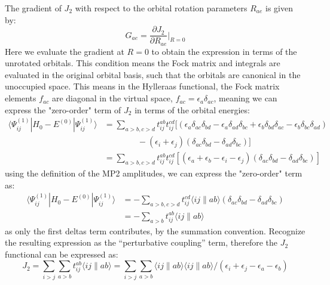 The gradient of $J_2$ with respect to the orbital rotation parameters $R_{ae}$ is given by:
\begin{equation}
    G_{ae} = \frac{\partial J_2}{\partial R_{ae}} \bigg|_{R=0} 
\end{equation}
Here we evaluate the gradient at $R=0$ to obtain the expression in terms of the unrotated orbitals. This condition means the Fock matrix and integrals are evaluated in the original orbital basis, such that the orbitals are canonical in the unoccupied space. This means in the Hylleraas functional, the Fock matrix elements $f_{ac}$ are diagonal in the virtual space, $f_{ac} = \epsilon_a \delta_{ac}$, meaning we can express the "zero-order" term of $J_2$ in terms of the orbital energies:
\begin{align}
    \langle\Psi^{(1)}_{ij}|H_0 - E^{(0)}|\Psi^{(1)}_{ij}\rangle 
    &= \sum_{a>b,c>d} t_{ij}^{ab} t_{ij}^{cd} [ (\epsilon_a \delta_{ac}\delta_{bd} - \epsilon_a \delta_{ad}\delta_{bc} + \epsilon_b \delta_{bd}\delta_{ac} - \epsilon_b \delta_{bc}\delta_{ad}) \\ &\qquad \qquad - (\epsilon_i + \epsilon_j)(\delta_{ac}\delta_{bd} - \delta_{ad}\delta_{bc})] \\
    &= \sum_{a>b,c>d} t_{ij}^{ab} t_{ij}^{cd} [ (\epsilon_a + \epsilon_b - \epsilon_i - \epsilon_j)(\delta_{ac}\delta_{bd} - \delta_{ad}\delta_{bc}) ]
\end{align}
using the definition of the MP2 amplitudes, we can express the "zero-order" term as:
\begin{align}
    \langle\Psi^{(1)}_{ij}|H_0 - E^{(0)}|\Psi^{(1)}_{ij}\rangle 
    &= - \sum_{a>b,c>d} t_{ij}^{cd}  \langle ij\|ab\rangle (\delta_{ac}\delta_{bd} - \delta_{ad}\delta_{bc}) \\
    &= - \sum_{a>b} t_{ij}^{ab} \langle ij\|ab\rangle
\end{align}
as only the first deltas term contributes, by the summation convention. Recognize the resulting expression as the “perturbative coupling” term, therefore the $J_2$ functional can be expressed as:
\begin{equation}
    J_2 = \sum_{i>j}\sum_{a>b} t_{ij}^{ab} \langle ij\|ab\rangle = \sum_{i>j}\sum_{a>b} \langle ij\|ab\rangle \langle ij\|ab\rangle / (\epsilon_i + \epsilon_j - \epsilon_a - \epsilon_b)
\end{equation}

